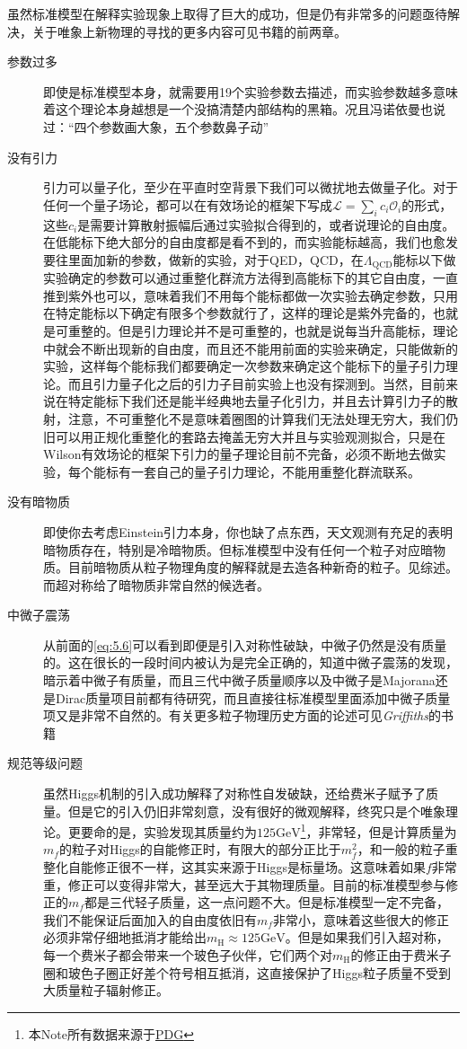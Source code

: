 虽然标准模型在解释实验现象上取得了巨大的成功，但是仍有非常多的问题亟待解决，关于唯象上新物理的寻找的更多内容可见书籍\cite{baer_weak_2006}的前两章。
\begin{description}
	\item[参数过多] 即使是标准模型本身，就需要用19个实验参数去描述，而实验参数越多意味着这个理论本身越想是一个没搞清楚内部结构的黑箱。况且冯诺依曼也说过：“四个参数画大象，五个参数鼻子动”\cite{10.1119/1.3254017}
	\item[没有引力]引力可以量子化，至少在平直时空背景下我们可以微扰地去做量子化。对于任何一个量子场论，都可以在有效场论的框架下写成$\mathcal{L}=\sum_ic_i\mathcal{O}_i$的形式，这些$c_i$是需要计算散射振幅后通过实验拟合得到的，或者说理论的自由度。在低能标下绝大部分的自由度都是看不到的，而实验能标越高，我们也愈发要往里面加新的参数，做新的实验，对于QED，QCD，在$\Lambda_{\mathrm{QCD}}$能标以下做实验确定的参数可以通过重整化群流方法得到高能标下的其它自由度，一直推到紫外也可以，意味着我们不用每个能标都做一次实验去确定参数，只用在特定能标以下确定有限多个参数就行了，这样的理论是紫外完备的，也就是可重整的。但是引力理论并不是可重整的，也就是说每当升高能标，理论中就会不断出现新的自由度，而且还不能用前面的实验来确定，只能做新的实验，这样每个能标我们都要确定一次参数来确定这个能标下的量子引力理论。而且引力量子化之后的引力子目前实验上也没有探测到。当然，目前来说在特定能标下我们还是能半经典地去量子化引力，并且去计算引力子的散射，注意，不可重整化不是意味着圈图的计算我们无法处理无穷大，我们仍旧可以用正规化重整化的套路去掩盖无穷大并且与实验观测拟合，只是在Wilson有效场论的框架下引力的量子理论目前不完备，必须不断地去做实验，每个能标有一套自己的量子引力理论，不能用重整化群流联系。
	\item[没有暗物质] 即使你去考虑Einstein引力本身，你也缺了点东西，天文观测有充足的表明暗物质存在，特别是冷暗物质。但标准模型中没有任何一个粒子对应暗物质。目前暗物质从粒子物理角度的解释就是去造各种新奇的粒子。见综述\cite{frieman_lectures_2008,Young:2016ala,bauer_yet_2019}。而超对称给了暗物质非常自然的候选者。
	\item[中微子震荡]从前面的\ref{eq:5.6}可以看到即便是引入对称性破缺，中微子仍然是没有质量的。这在很长的一段时间内被认为是完全正确的，知道中微子震荡的发现，暗示着中微子有质量，而且三代中微子质量顺序以及中微子是Majorana还是Dirac质量项目前都有待研究，而且直接往标准模型里面添加中微子质量项又是非常不自然的。有关更多粒子物理历史方面的论述可见{\itshape Griffiths}的书籍\cite{Griffiths}
	\item [规范等级问题] 虽然Higgs机制的引入成功解释了对称性自发破缺，还给费米子赋予了质量。但是它的引入仍旧非常刻意，没有很好的微观解释，终究只是个唯象理论。更要命的是，实验发现其质量约为$125\mathrm{GeV}$\footnote{本Note所有数据来源于\href{https://pdg.lbl.gov/}{PDG}}，非常轻，但是计算质量为$m_f$的粒子对Higgs的自能修正时，有限大的部分正比于$m_f^2$，和一般的粒子重整化自能修正很不一样，这其实来源于Higgs是标量场。这意味着如果$f$非常重，修正可以变得非常大，甚至远大于其物理质量。目前的标准模型参与修正的$m_f$都是三代轻子质量，这一点问题不大。但是标准模型一定不完备，我们不能保证后面加入的自由度依旧有$m_f$非常小，意味着这些很大的修正必须非常仔细地抵消才能给出$m_{\mathrm{H}}\approx 125\mathrm{GeV}$。但是如果我们引入超对称，每一个费米子都会带来一个玻色子伙伴，它们两个对$m_{\mathrm{H}}$的修正由于费米子圈和玻色子圈正好差个符号相互抵消，这直接保护了Higgs粒子质量不受到大质量粒子辐射修正。

\end{description}
